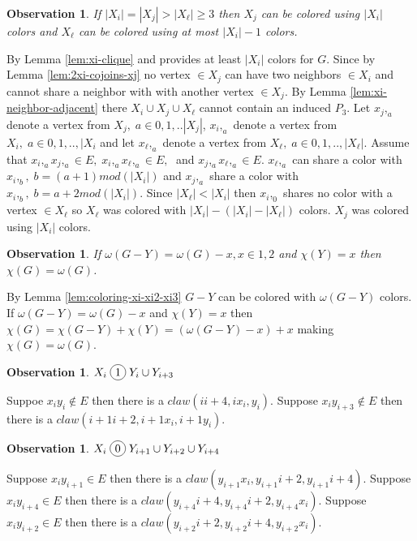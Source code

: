 \documentclass[12pt]{article}
\newcommand*\circled[1]{\tikz[baseline=(char.base)]{
            \node[shape=circle,draw,inner sep=2pt] (char) {#1};}}
\newtheorem{Observation}[Theorem]{Observation}
\begin{document}
\begin{Observation}\label{obs:xi-e-g}
If $|X_i| = |X_j| > |X_\ell| \geq 3$ then $X_j$  can be colored using $|X_i|$ colors and $X_\ell$ can be colored using at most $|X_i| - 1$ colors.
\end{Observation}
 By Lemma \ref{lem:xi-clique} and provides at least $|X_i|$ colors for $G$. Since by Lemma \ref{lem:2xi-cojoins-xj} no vertex $\in X_j$ can have two neighbors $\in X_i$ and cannot share a neighbor with with another vertex $\in X_j$. By Lemma \ref{lem:xi-neighbor-adjacent} there $X_i \cup X_j \cup X_\ell$ cannot contain an induced $P_3$. Let $x_j,_a$ denote a vertex from $X_j,\; a \in {0, 1,..|X_j|}$, $x_i,_a$ denote a vertex from $X_i,\; a \in {0, 1,.., |X_i}$ and let $x_\ell,_a$ denote a vertex from $X_\ell, \; a \in {0, 1,.., |X_\ell|}$. Assume that $x_i,_ax_j,_a \in E,\; x_i,_ax_\ell,_a \in E,\;$ and $ x_j,_ax_\ell,_a \in E$. $x_\ell,_a$ can share a color with $x_i,_{b},\; b = (a +1) mod (|X_i|)$ and $x_j,_a$ share a color with $x_i,_{b},\; b = a+2 mod(|X_i|)$.  Since $|X_\ell| < |X_i|$ then $x_i,_0$ shares no color with a vertex $\in X_\ell$ so $X_\ell$ was colored with $|X_i| - (|X_i| - |X_\ell|)$ colors. $X_j$ was colored using $|X_i|$ colors. 

\begin{Observation}\label{obs:clique-chi}
If $\omega(G - Y) = \omega(G) - x, x \in {1,2}$ and $\chi(Y) = x$ then $\chi(G) = \omega(G)$.
\end{Observation}
 By Lemma \ref{lem:coloring-xi-xi2-xi3} $G - Y$ can be colored with $\omega(G - Y)$ colors. If $\omega(G - Y) = \omega(G) - x$ and $\chi(Y) = x$ then $ \chi(G) = \chi(G - Y) + \chi(Y) = (\omega(G - Y) - x)  + x$ making $\chi(G) = \omega(G)$.

\begin{Observation}\label{obs:xi-joins-yi}
$X_i \; \circled{1} \; Y_i \cup Y_{i+3}$
\end{Observation}
 Suppoe $x_iy_i \not \in E$ then there is a $claw (ii+4, ix_i, y_i)$. Suppose $x_iy_{i+3} \not \in E$ then there is a $claw (i+1i+2, i+1x_i, i+1y_i)$.

\begin{Observation}\label{obs:xi-cojoins-yi}
$X_i \; \circled{0} \; Y_{i+1} \cup Y_{i+2} \cup Y_{i+4}$
\end{Observation}
 Suppose $x_iy_{i+1} \in E$ then there is a $claw (y_{i+1}x_i, y_{i+1}i+2,y_{i+1}i+4)$. Suppose $x_iy_{i+4} \in E$ then there is a $claw (y_{i+4}i+4, y_{i+4}i+2, y_{i+4}x_i)$. Suppose $x_iy_{i+2} \in E$ then there is a $claw (y_{i+2}i+2, y_{i+2}i+4, y_{i+2}x_i)$.
\end{document}
